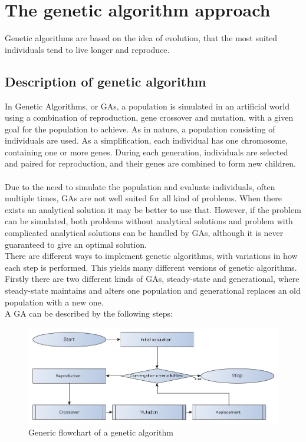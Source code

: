 \pagebreak
\section{The genetic algorithm approach}
Genetic algorithms are based on the idea of evolution, that the most suited individuals tend to live longer and reproduce. 
\subsection{Description of genetic algorithm}
In Genetic Algorithms, or GAs, a population is simulated in an artificial world using a combination of reproduction, gene crossover and mutation, with a given goal for the population to achieve. As in nature, a population consisting of individuals are used. As a simplification, each individual has one chromosome, containing one or more genes. During each generation, individuals are selected and paired for reproduction, and their genes are combined to form new children.\\
\\
Due to the need to simulate the population and evaluate individuals, often multiple times, GAs are not well suited for all kind of problems. When there exists an analytical solution it may be better to use that. However, if the problem can be simulated, both problems without analytical solutions and problem with complicated analytical solutions can be handled by GAs, although it is never guaranteed to give an optimal solution.\\
There are different ways to implement genetic algorithms, with variations in how each step is performed. This yields many different versions of genetic algorithms. Firstly there are two different kinds of GAs, steady-state and generational, where steady-state maintains and alters one population and generational replaces an old population with a new one.\\
A GA can be described by the following steps:
\begin{figure}[!h]
	\centering
	\includegraphics[width=\textwidth]{chapter_4_methods/GeneticFlowChart-Generic.jpg}
  	\caption[Generic flowchart of a genetic algorithm]
  	{Generic flowchart of a genetic algorithm}
\end{figure}
